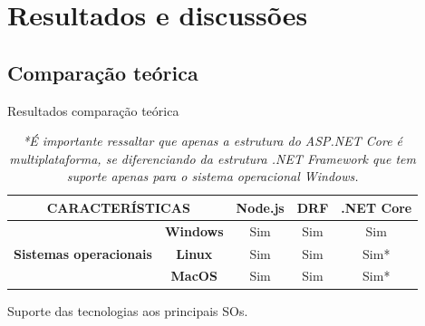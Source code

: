 \documentclass{libs/ufc_format}
\begin{document}
\section{Resultados e discussões}

\subsection{Comparação teórica}
\begin{frame}{Resultados comparação teórica}
    \begin{table}[H]
        \centering
        \begin{tabular}{|cc|c|c|c|}
        \hline
        \multicolumn{2}{|c|}{\textbf{CARACTERÍSTICAS}}                                           & \textbf{Node.js} & \textbf{DRF} & \textbf{.NET Core} \\ \hline
        \multicolumn{1}{|c|}{\multirow{3}{*}{\textbf{Sistemas operacionais}}} & \textbf{Windows} & Sim              & Sim          & Sim                   \\ \cline{2-5} 
        \multicolumn{1}{|c|}{}                                                & \textbf{Linux}   & Sim              & Sim          & Sim*                  \\ \cline{2-5} 
        \multicolumn{1}{|c|}{}                                                & \textbf{MacOS}   & Sim              & Sim          & Sim*                  \\ \hline
        \end{tabular}
        \captionsetup{justification=centering}
        \caption{Suporte das tecnologias aos principais SOs.}
        \caption*{\textit{*É importante ressaltar que apenas a estrutura do ASP.NET Core é multiplataforma, se diferenciando da estrutura .NET Framework que tem suporte apenas para o sistema operacional Windows.}}
        \label{tab:resultado-so}
    \end{table}
\end{frame}
\end{document}
